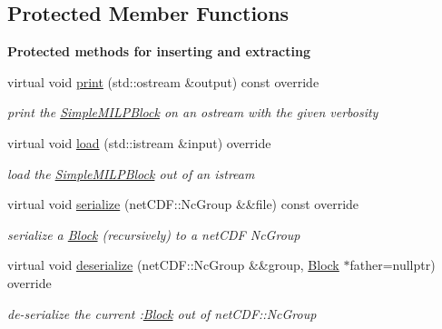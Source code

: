 \subsection*{Protected Member Functions}
\begin{Indent}\textbf{ Protected methods for inserting and extracting}\par
\begin{DoxyCompactItemize}
\item 
\mbox{\label{class_s_m_spp__di__unipi__it_1_1_simple_m_i_l_p_block_a59a9fcbf8f9f86d348344b2073644b0e}} 
virtual void \mbox{\hyperlink{class_s_m_spp__di__unipi__it_1_1_simple_m_i_l_p_block_a59a9fcbf8f9f86d348344b2073644b0e}{print}} (std\+::ostream \&output) const override
\begin{DoxyCompactList}\small\item\em print the \mbox{\hyperlink{class_s_m_spp__di__unipi__it_1_1_simple_m_i_l_p_block}{Simple\+M\+I\+L\+P\+Block}} on an ostream with the given verbosity \end{DoxyCompactList}\item 
virtual void \mbox{\hyperlink{class_s_m_spp__di__unipi__it_1_1_simple_m_i_l_p_block_a019850055afe817b816bae5699f461d3}{load}} (std\+::istream \&input) override
\begin{DoxyCompactList}\small\item\em load the \mbox{\hyperlink{class_s_m_spp__di__unipi__it_1_1_simple_m_i_l_p_block}{Simple\+M\+I\+L\+P\+Block}} out of an istream \end{DoxyCompactList}\item 
virtual void \mbox{\hyperlink{class_s_m_spp__di__unipi__it_1_1_simple_m_i_l_p_block_aefb3f33afdab2b6f4aef3f926c10df51}{serialize}} (net\+C\+D\+F\+::\+Nc\+Group \&\&file) const override
\begin{DoxyCompactList}\small\item\em serialize a \mbox{\hyperlink{class_s_m_spp__di__unipi__it_1_1_block}{Block}} (recursively) to a net\+C\+DF Nc\+Group \end{DoxyCompactList}\item 
virtual void \mbox{\hyperlink{class_s_m_spp__di__unipi__it_1_1_simple_m_i_l_p_block_a817e3ce47ea40c14517ec16c6b62b814}{deserialize}} (net\+C\+D\+F\+::\+Nc\+Group \&\&group, \mbox{\hyperlink{class_s_m_spp__di__unipi__it_1_1_block}{Block}} $\ast$father=nullptr) override
\begin{DoxyCompactList}\small\item\em de-\/serialize the current \+:\mbox{\hyperlink{class_s_m_spp__di__unipi__it_1_1_block}{Block}} out of net\+C\+D\+F\+::\+Nc\+Group \end{DoxyCompactList}\end{DoxyCompactItemize}
\end{Indent}
